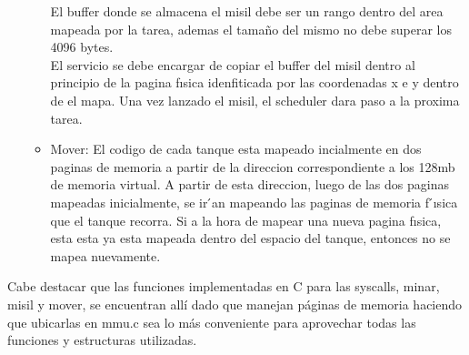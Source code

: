 \begin{itemize}
\begin{itemize}
El buffer donde se almacena el misil debe ser un rango dentro del area mapeada por la
tarea, ademas el tamaño del mismo no debe superar los 4096 bytes.\\
El servicio se debe encargar de copiar el buffer del misil dentro al principio de la pagina
fısica idenfiticada por las coordenadas x e y dentro de el mapa. Una vez lanzado el misil,
el scheduler dara paso a la proxima tarea.\\
   \item Mover: El codigo de cada tanque esta mapeado incialmente en dos paginas de memoria a 
   partir de la direccion correspondiente a los 128mb de memoria virtual. A partir de esta
direccion, luego de las dos paginas mapeadas inicialmente, se ir ́an mapeando las 
paginas de memoria f ́ısica que el tanque recorra. Si a la hora de mapear una nueva pagina
fısica, esta esta ya esta mapeada dentro del espacio del tanque, entonces no se mapea
nuevamente.
  \end{itemize}

\end{itemize}

Cabe destacar que las funciones implementadas en C para las syscalls, minar, misil y mover, se encuentran allí dado que manejan p\'aginas
de memoria haciendo que ubicarlas en mmu.c sea lo m\'as conveniente para aprovechar todas las funciones y estructuras utilizadas. 
